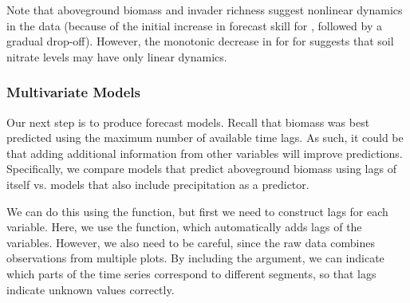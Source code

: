 \documentclass[article]{jss}
\begin{document}
Note that aboveground biomass and invader richness suggest nonlinear dynamics in the data (because of the initial increase in forecast skill for , followed by a gradual drop-off). However, the monotonic decrease in  for  for  suggests that soil nitrate levels may have only linear dynamics.

\subsubsection{Multivariate Models}\label{sec:e120-multivariate-models}

Our next step is to produce forecast models. Recall that biomass was best predicted using the maximum number of available time lags. As such, it could be that adding additional information from other variables will improve predictions. Specifically, we compare models that predict aboveground biomass using lags of itself vs. models that also include precipitation as a predictor.

We can do this using the  function, but first we need to construct lags for each variable. Here, we use the  function, which automatically adds lags of the variables. However, we also need to be careful, since the raw data combines observations from multiple plots. By including the  argument, we can indicate which parts of the time series correspond to different segments, so that lags indicate unknown values correctly.

\begin{Schunk}
\end{Schunk}
\end{document}
